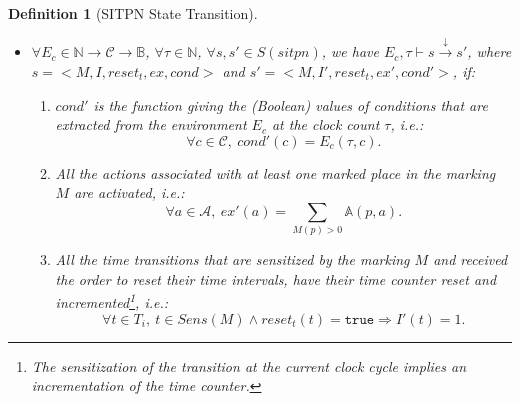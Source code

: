 \documentclass[pdflatex,sn-mathphys]{sn-jnl}%
\theoremstyle{thmstyleone}%
\theoremstyle{thmstyletwo}%
\theoremstyle{thmstylethree}%
\newtheorem{definition}{Definition}%
\begin{document}
\begin{definition}[SITPN State Transition]
\begin{itemize}
  \item
    $\forall{}E_c\in\mathbb{N}\rightarrow\mathcal{C}\rightarrow\mathbb{B}$,
    $\forall\tau\in\mathbb{N}$, $\forall{}s,s'\in{}S(sitpn)$, we have
    $E_c,\tau\vdash{}s\xrightarrow{\downarrow}s'$, where
    $s=<M,I,reset_t,ex,cond>$ and $s'=<M,I',reset_t,ex',cond'>$, if:
    \begin{enumerate}[resume]
    \item\label{it:cond-env} $cond'$ is the function giving the
      (Boolean) values of conditions that are extracted from the
      environment $E_c$ at the clock count
      $\tau$, i.e.:
      \begin{equation*}
        \forall{}c\in{}\mathcal{C},~cond'(c)=E_c(\tau,c).
      \end{equation*}
      
    \item\label{it:activate-actions} All the actions associated
      with at least one
      marked place in the marking $M$ are activated, i.e.:
      \begin{equation*}
        \forall{}a\in{}\mathcal{A},~ex'(a)=\sum\limits_{M(p)>0}\mathbb{A}(p,a).
      \end{equation*}
    \item\label{it:reset-counters} All the time transitions that are
      sensitized by the marking $M$ and received the order to reset
      their time intervals, have their time counter reset and
      incremented\footnote{The sensitization of the transition at the
        current clock cycle implies an incrementation of the time
        counter.}, i.e.:
      \begin{equation*}
        \forall{}t\in{}T_i,~t\in{}Sens(M)\land{}reset_t(t)=\mathtt{true}
        \Rightarrow{}I'(t)=1.
      \end{equation*}
      

\end{enumerate}
\end{itemize}
\end{definition}
\end{document}
